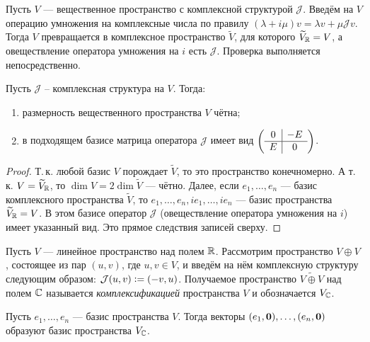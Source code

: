 Пусть $V$ --- вещественное пространство с комплексной структурой $\mathcal{J}$. Введём на $V$ операцию умножения на комплексные числа по правилу $(\lambda + i\mu)v = \lambda v + \mu\mathcal{J}v$. Тогда $V$ превращается в комплексное пространство $\widetilde{V}$, для которого $\widetilde{V}_{\mathbb{R}} = V$, а овеществление оператора умножения на $i$ есть $\mathcal{J}$. Проверка выполняется непосредственно.

\begin{proposal}
    Пусть $\mathcal{J}$ -- комплексная структура на $V$. Тогда:
    \begin{enumerate}[nolistsep]
        \item размерность вещественного пространства $V$ чётна;
        \item в подходящем базисе матрица оператора $\mathcal{J}$ имеет вид
            $
            \left(
            \begin{array}{c | c}
                0 & -E\\
                \hline
                E & 0
            \end{array}
            \right)
            $.
    \end{enumerate}
\end{proposal}

\begin{proof}
    Т.\,к. любой базис $V$ порождает $\widetilde{V}$, то это пространство конечномерно. А т.\,к. $V = \widetilde{V}_{\mathbb{R}}$, то $\dim V = 2\dim\widetilde{V}$ --- чётно. Далее, если $e_1, \ldots, e_n$ --- базис комплексного пространства $\widetilde{V}$, то $e_1, \ldots, e_n, ie_1, \ldots, ie_n$ --- базис пространства $\widetilde{V}_{\mathbb{R}} = V$. В этом базисе оператор $\mathcal{J}$ (овеществление оператора умножения на $i$) имеет указанный вид. Это прямое следствия записей сверху.
\end{proof}

\begin{definition}
    Пусть $V$ --- линейное пространство над полем $\mathbb{R}$. Рассмотрим пространство $V \oplus V$, состоящее из пар $(u, v)$, где $u, v \in V$, и введём на нём комплексную структуру следующим образом: $\mathcal{J}(u, v) \vcentcolon = (-v, u)$. Получаемое пространство $\widetilde{V \oplus V}$ над полем $\mathbb{C}$ называется \textit{комплексификацией} пространства $V$ и обозначается $V_{\mathbb{C}}$.
\end{definition}

\begin{proposal}
    Пусть $e_1, \ldots, e_n$ --- базис пространства $V$. Тогда векторы $(e_1, \boldsymbol{0}), \ldots, (e_n, \boldsymbol{0})$ образуют базис пространства $V_{\mathbb{C}}$.
\end{proposal}

